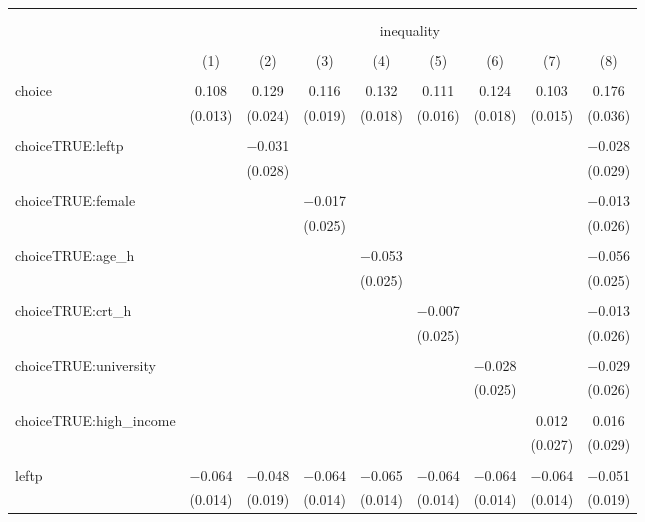 
\begin{table}[!htbp] \centering 
  \caption{} 
  \label{} 
\begin{tabular}{@{\extracolsep{5pt}}lcccccccc} 
\\[-1.8ex]\hline 
\hline \\[-1.8ex] 
\\[-1.8ex] & \multicolumn{8}{c}{inequality} \\ 
\\[-1.8ex] & (1) & (2) & (3) & (4) & (5) & (6) & (7) & (8)\\ 
\hline \\[-1.8ex] 
 choice & 0.108 & 0.129 & 0.116 & 0.132 & 0.111 & 0.124 & 0.103 & 0.176 \\ 
  & (0.013) & (0.024) & (0.019) & (0.018) & (0.016) & (0.018) & (0.015) & (0.036) \\ 
  & & & & & & & & \\ 
 choiceTRUE:leftp &  & $-$0.031 &  &  &  &  &  & $-$0.028 \\ 
  &  & (0.028) &  &  &  &  &  & (0.029) \\ 
  & & & & & & & & \\ 
 choiceTRUE:female &  &  & $-$0.017 &  &  &  &  & $-$0.013 \\ 
  &  &  & (0.025) &  &  &  &  & (0.026) \\ 
  & & & & & & & & \\ 
 choiceTRUE:age\_h &  &  &  & $-$0.053 &  &  &  & $-$0.056 \\ 
  &  &  &  & (0.025) &  &  &  & (0.025) \\ 
  & & & & & & & & \\ 
 choiceTRUE:crt\_h &  &  &  &  & $-$0.007 &  &  & $-$0.013 \\ 
  &  &  &  &  & (0.025) &  &  & (0.026) \\ 
  & & & & & & & & \\ 
 choiceTRUE:university &  &  &  &  &  & $-$0.028 &  & $-$0.029 \\ 
  &  &  &  &  &  & (0.025) &  & (0.026) \\ 
  & & & & & & & & \\ 
 choiceTRUE:high\_income &  &  &  &  &  &  & 0.012 & 0.016 \\ 
  &  &  &  &  &  &  & (0.027) & (0.029) \\ 
  & & & & & & & & \\ 
 leftp & $-$0.064 & $-$0.048 & $-$0.064 & $-$0.065 & $-$0.064 & $-$0.064 & $-$0.064 & $-$0.051 \\ 
  & (0.014) & (0.019) & (0.014) & (0.014) & (0.014) & (0.014) & (0.014) & (0.019) \\ 

\end{tabular}
\end{table}
